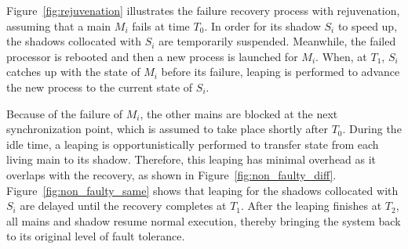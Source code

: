 

Figure~\ref{fig:rejuvenation} illustrates the failure recovery process with rejuvenation, assuming that a main $M_i$ fails at time $T_0$.
In order for its shadow $S_i$ to speed up, the shadows collocated with $S_i$ are temporarily suspended. %
Meanwhile, the failed processor is rebooted and then a new process is launched for $M_i$. When, at $T_1$, $S_i$ catches up with the state of $M_i$ before its failure, leaping is performed to advance the new process to the current state of $S_i$. %

Because of the failure of $M_i$, the other mains are blocked at the next synchronization point, which is assumed to take place shortly after $T_0$. During the idle time, a leaping is opportunistically performed to transfer state from each living main to its shadow. Therefore, this leaping has minimal overhead as it overlaps with the recovery, as shown in Figure~\ref{fig:non_faulty_diff}. Figure~\ref{fig:non_faulty_same} shows that leaping for the shadows collocated with $S_i$ are delayed until the recovery completes at $T_1$. After the leaping finishes at $T_2$, all mains and shadow resume normal execution, thereby bringing the system back to its original level of fault tolerance.



